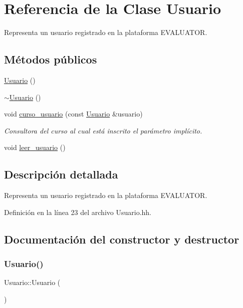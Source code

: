 \hypertarget{class_usuario}{}\section{Referencia de la Clase Usuario}
\label{class_usuario}


Representa un usuario registrado en la plataforma E\+V\+A\+L\+U\+A\+T\+OR.  


\subsection*{Métodos públicos}
\begin{DoxyCompactItemize}
\item 
\mbox{\hyperlink{class_usuario_aa85a5371a098dfba5449140d9b8a472f}{Usuario}} ()
\item 
\mbox{\hyperlink{class_usuario_ab4096b0b8300ecb47b10c555fb09c997}{$\sim$\+Usuario}} ()
\item 
void \mbox{\hyperlink{class_usuario_a5c6a46acdcb1397ba7600e7b97493e4a}{curso\+\_\+usuario}} (const \mbox{\hyperlink{class_usuario}{Usuario}} \&usuario)
\begin{DoxyCompactList}\small\item\em Consultora del curso al cual está inscrito el parámetro implícito. \end{DoxyCompactList}\item 
void \mbox{\hyperlink{class_usuario_a2643a5c29f64aab2c531f78d2618e891}{leer\+\_\+usuario}} ()
\end{DoxyCompactItemize}


\subsection{Descripción detallada}
Representa un usuario registrado en la plataforma E\+V\+A\+L\+U\+A\+T\+OR. 

Definición en la línea 23 del archivo Usuario.\+hh.



\subsection{Documentación del constructor y destructor}
\mbox{\label{class_usuario_aa85a5371a098dfba5449140d9b8a472f}} 
\subsubsection{\texorpdfstring{Usuario()}{Usuario()}}
{\footnotesize\ttfamily Usuario\+::\+Usuario (\begin{DoxyParamCaption}{ }\end{DoxyParamCaption})}

